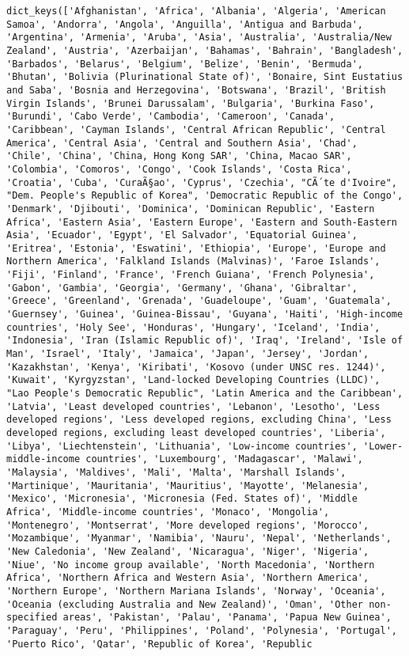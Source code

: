 \documentclass[
  letterpaper,
  DIV=11,
  numbers=noendperiod]{scrreprt}
\begin{document}
\begin{verbatim}
dict_keys(['Afghanistan', 'Africa', 'Albania', 'Algeria', 'American Samoa', 'Andorra', 'Angola', 'Anguilla', 'Antigua and Barbuda', 'Argentina', 'Armenia', 'Aruba', 'Asia', 'Australia', 'Australia/New Zealand', 'Austria', 'Azerbaijan', 'Bahamas', 'Bahrain', 'Bangladesh', 'Barbados', 'Belarus', 'Belgium', 'Belize', 'Benin', 'Bermuda', 'Bhutan', 'Bolivia (Plurinational State of)', 'Bonaire, Sint Eustatius and Saba', 'Bosnia and Herzegovina', 'Botswana', 'Brazil', 'British Virgin Islands', 'Brunei Darussalam', 'Bulgaria', 'Burkina Faso', 'Burundi', 'Cabo Verde', 'Cambodia', 'Cameroon', 'Canada', 'Caribbean', 'Cayman Islands', 'Central African Republic', 'Central America', 'Central Asia', 'Central and Southern Asia', 'Chad', 'Chile', 'China', 'China, Hong Kong SAR', 'China, Macao SAR', 'Colombia', 'Comoros', 'Congo', 'Cook Islands', 'Costa Rica', 'Croatia', 'Cuba', 'CuraÃ§ao', 'Cyprus', 'Czechia', "CÃ´te d'Ivoire", "Dem. People's Republic of Korea", 'Democratic Republic of the Congo', 'Denmark', 'Djibouti', 'Dominica', 'Dominican Republic', 'Eastern Africa', 'Eastern Asia', 'Eastern Europe', 'Eastern and South-Eastern Asia', 'Ecuador', 'Egypt', 'El Salvador', 'Equatorial Guinea', 'Eritrea', 'Estonia', 'Eswatini', 'Ethiopia', 'Europe', 'Europe and Northern America', 'Falkland Islands (Malvinas)', 'Faroe Islands', 'Fiji', 'Finland', 'France', 'French Guiana', 'French Polynesia', 'Gabon', 'Gambia', 'Georgia', 'Germany', 'Ghana', 'Gibraltar', 'Greece', 'Greenland', 'Grenada', 'Guadeloupe', 'Guam', 'Guatemala', 'Guernsey', 'Guinea', 'Guinea-Bissau', 'Guyana', 'Haiti', 'High-income countries', 'Holy See', 'Honduras', 'Hungary', 'Iceland', 'India', 'Indonesia', 'Iran (Islamic Republic of)', 'Iraq', 'Ireland', 'Isle of Man', 'Israel', 'Italy', 'Jamaica', 'Japan', 'Jersey', 'Jordan', 'Kazakhstan', 'Kenya', 'Kiribati', 'Kosovo (under UNSC res. 1244)', 'Kuwait', 'Kyrgyzstan', 'Land-locked Developing Countries (LLDC)', "Lao People's Democratic Republic", 'Latin America and the Caribbean', 'Latvia', 'Least developed countries', 'Lebanon', 'Lesotho', 'Less developed regions', 'Less developed regions, excluding China', 'Less developed regions, excluding least developed countries', 'Liberia', 'Libya', 'Liechtenstein', 'Lithuania', 'Low-income countries', 'Lower-middle-income countries', 'Luxembourg', 'Madagascar', 'Malawi', 'Malaysia', 'Maldives', 'Mali', 'Malta', 'Marshall Islands', 'Martinique', 'Mauritania', 'Mauritius', 'Mayotte', 'Melanesia', 'Mexico', 'Micronesia', 'Micronesia (Fed. States of)', 'Middle Africa', 'Middle-income countries', 'Monaco', 'Mongolia', 'Montenegro', 'Montserrat', 'More developed regions', 'Morocco', 'Mozambique', 'Myanmar', 'Namibia', 'Nauru', 'Nepal', 'Netherlands', 'New Caledonia', 'New Zealand', 'Nicaragua', 'Niger', 'Nigeria', 'Niue', 'No income group available', 'North Macedonia', 'Northern Africa', 'Northern Africa and Western Asia', 'Northern America', 'Northern Europe', 'Northern Mariana Islands', 'Norway', 'Oceania', 'Oceania (excluding Australia and New Zealand)', 'Oman', 'Other non-specified areas', 'Pakistan', 'Palau', 'Panama', 'Papua New Guinea', 'Paraguay', 'Peru', 'Philippines', 'Poland', 'Polynesia', 'Portugal', 'Puerto Rico', 'Qatar', 'Republic of Korea', 'Republic 
\end{verbatim}
\end{document}
